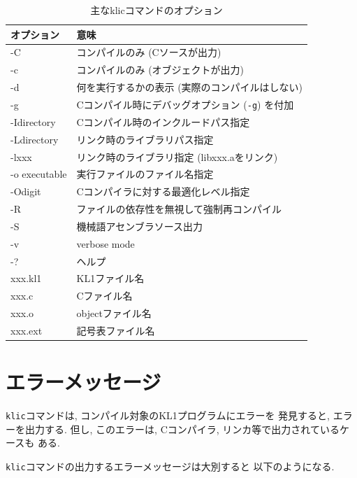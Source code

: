 \documentclass[a4,titlepage]{jsreport}
\begin{document}
\begin{table}
\caption{主なklicコマンドのオプション}
\label{tab:options}
\begin{center}
\begin{tabular}{l||l}
\hline
オプション & 意味\\
\hline\hline
-C & コンパイルのみ (Cソースが出力)\\
\hline
-c & コンパイルのみ (オブジェクトが出力)\\
\hline
-d & 何を実行するかの表示 (実際のコンパイルはしない)\\
\hline
-g & Cコンパイル時にデバッグオプション ({\tt -g}) を付加\\
\hline
-Idirectory & Cコンパイル時のインクルードパス指定\\
\hline
-Ldirectory & リンク時のライブラリパス指定\\
\hline
-lxxx & リンク時のライブラリ指定 (libxxx.aをリンク)\\
\hline
-o executable & 実行ファイルのファイル名指定\\
\hline
-Odigit & Cコンパイラに対する最適化レベル指定\\
\hline
-R & ファイルの依存性を無視して強制再コンパイル\\
\hline
-S & 機械語アセンブラソース出力\\
\hline
-v & verbose mode\\
\hline
-? & ヘルプ\\
\hline
\hline
xxx.kl1 & KL1ファイル名\\
\hline
xxx.c & Cファイル名\\
\hline
xxx.o & objectファイル名\\
\hline
xxx.ext & 記号表ファイル名\\
\hline
\end{tabular}
\end{center}
\vspace*{-12pt}
\end{table}

\section{エラーメッセージ}
\verb|klic|コマンドは, コンパイル対象のKL1プログラムにエラーを
発見すると, エラーを出力する.  
但し, このエラーは, Cコンパイラ, リンカ等で出力されているケースも
ある.  

\verb|klic|コマンドの出力するエラーメッセージは大別すると
以下のようになる.  
\end{document}

